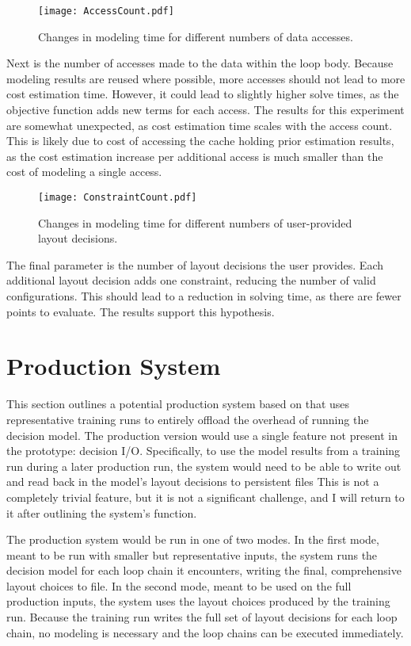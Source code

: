 \begin{figure}
	\texttt{[image: AccessCount.pdf]}
	\caption{Changes in modeling time for different numbers of data accesses.}\label{AccessCount}
\end{figure}
Next is the number of accesses made to the data within the loop body.
Because modeling results are reused where possible, more accesses should not lead to more cost estimation time. 
However, it could lead to slightly higher solve times, as the objective function adds new terms for each access.
The results for this experiment are somewhat unexpected, as cost estimation time scales with the access count.
This is likely due to cost of accessing the cache holding prior estimation results, as the cost estimation increase per additional access is much smaller than the cost of modeling a single access.

\begin{figure}
	\texttt{[image: ConstraintCount.pdf]}
	\caption{Changes in modeling time for different numbers of user-provided layout decisions.}\label{ConstraintCount}
\end{figure}

The final parameter is the number of layout decisions the user provides. 
Each additional layout decision adds one constraint, reducing the number of valid configurations. 
This should lead to a reduction in solving time, as there are fewer points to evaluate.
The results support this hypothesis.

\section{Production System}

This section outlines a potential production system based on \FormatDecisions{} that uses representative training runs to entirely offload the overhead of running the decision model.
The production version would use a single feature not present in the prototype: decision I/O.
Specifically, to use the model results from a training run during a later production run, the system would need to be able to write out and read back in the model's layout decisions to persistent files 
This is not a completely trivial feature, but it is not a significant challenge, and I will return to it after outlining the system's function.

The production system would be run in one of two modes.
In the first mode, meant to be run with smaller but representative inputs, the system runs the decision model for each loop chain it encounters, writing the final, comprehensive layout choices to file.
In the second mode, meant to be used on the full production inputs, the system uses the layout choices produced by the training run.
Because the training run writes the full set of layout decisions for each loop chain, no modeling is necessary and the loop chains can be executed immediately.

